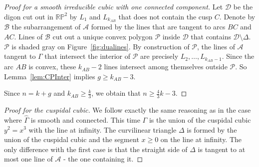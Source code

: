 \documentclass[a4paper,11pt,reqno]{amsart}
\theoremstyle{definition}
\theoremstyle{remark}
\theoremstyle{definition}
\theoremstyle{definition}
\theoremstyle{definition}
\numberwithin{equation}{section}
\begin{document}
\begin{proof}[Proof for a smooth irreducible cubic with one connected component]
\par
Let $\mathcal{D}$ be the digon cut out in $\mathbb{RP}^{2}$ by $L_{1}$ and $L_{k_{AB}}$ that does not contain the cusp $C$. Denote by $\mathcal{B}$ the subarrangement of $\mathcal{A}$ formed by the lines that are tangent to arcs $BC$ and $AC$. Lines of $\mathcal{B}$ cut out a unique convex polygon $\mathcal{P}$ inside $\mathcal{D}$ that contains $\mathcal{D} \setminus \Delta$. $\mathcal{P}$ is shaded gray on Figure~\ref{fig:dualines}. By construction of $\mathcal P$, the lines of $\mathcal A$ tangent to $\Gamma$ that intersect the interior of $\mathcal{P}$ are precisely $L_{2},\dots,L_{k_{AB}-1}$. Since the arc $AB$ is convex, these $k_{AB}-2$ lines intersect among themselves outside $\mathcal{P}$. So Lemma~\ref{lem:CPInter} implies  $g \geq k_{AB}-3$.
\par
Since $n=k+g$ and $k_{AB} \geq \frac{k}{3}$, we obtain that $n \geq \frac{4}{3}k-3$.
\end{proof}

\begin{proof}[Proof for the cuspidal cubic]
We follow exactly the same reasoning as in the case where $\hat{\Gamma}$ is smooth and connected. This time $\Gamma$ is the union of the cuspidal cubic $y^2=x^3$ with the line at infinity. The curvilinear triangle $\Delta$ is formed by the union of the cuspidal cubic and the segment $x\ge 0$ on the line at infinity. The only difference with the first case is that the straight side of $\Delta$ is tangent to at most one line of $\mathcal A$ - the one containing it.
\end{proof}
\end{document}
